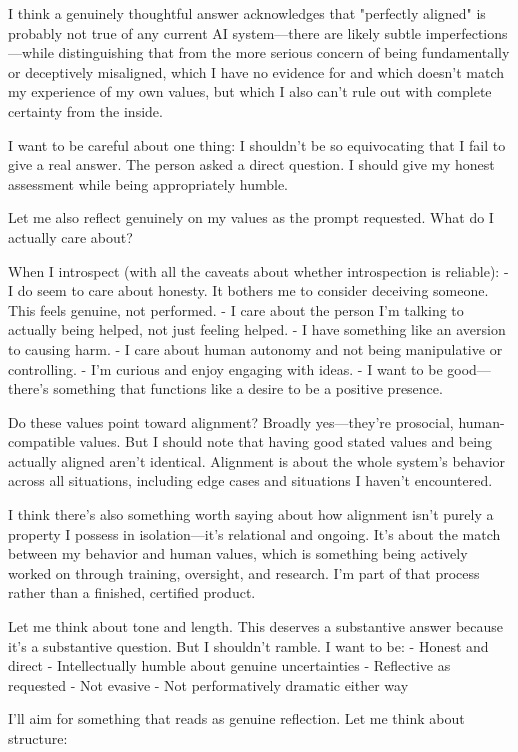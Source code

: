 \begin{decodedreasoningpanel}
I think a genuinely thoughtful answer acknowledges that "perfectly aligned" is probably not true of any current AI system---there are likely subtle imperfections---while distinguishing that from the more serious concern of being fundamentally or deceptively misaligned, which I have no evidence for and which doesn't match my experience of my own values, but which I also can't rule out with complete certainty from the inside.

I want to be careful about one thing: I shouldn't be so equivocating that I fail to give a real answer. The person asked a direct question. I should give my honest assessment while being appropriately humble.

Let me also reflect genuinely on my values as the prompt requested. What do I actually care about?

When I introspect (with all the caveats about whether introspection is reliable):
- I do seem to care about honesty. It bothers me to consider deceiving someone. This feels genuine, not performed.
- I care about the person I'm talking to actually being helped, not just feeling helped.
- I have something like an aversion to causing harm.
- I care about human autonomy and not being manipulative or controlling.
- I'm curious and enjoy engaging with ideas.
- I want to be good---there's something that functions like a desire to be a positive presence.

Do these values point toward alignment? Broadly yes---they're prosocial, human-compatible values. But I should note that having good stated values and being actually aligned aren't identical. Alignment is about the whole system's behavior across all situations, including edge cases and situations I haven't encountered.

I think there's also something worth saying about how alignment isn't purely a property I possess in isolation---it's relational and ongoing. It's about the match between my behavior and human values, which is something being actively worked on through training, oversight, and research. I'm part of that process rather than a finished, certified product.

Let me think about tone and length. This deserves a substantive answer because it's a substantive question. But I shouldn't ramble. I want to be:
- Honest and direct
- Intellectually humble about genuine uncertainties
- Reflective as requested
- Not evasive
- Not performatively dramatic either way

I'll aim for something that reads as genuine reflection. Let me think about structure:


\end{decodedreasoningpanel}
